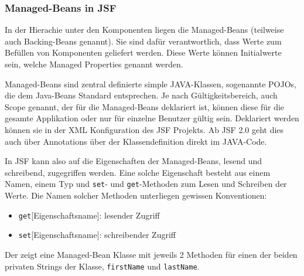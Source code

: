 \documentclass[12pt, twoside, a4paper, ngerman]{article}
\begin{document}
	

\subsubsection{Managed-Beans in JSF}

In der Hierachie unter den Komponenten liegen die Managed-Beans (teilweise auch Backing-Beans genannt). Sie sind dafür verantwortlich, dass Werte zum Befüllen von Komponenten geliefert werden. Diese Werte können Initialwerte sein, welche Managed Properties genannt werden.

Managed-Beans sind zentral definierte simple JAVA-Klassen, sogenannte \glspl{POJO}, die dem Java-Beans Standard entsprechen.
Je nach Gültigkeitsbereich, auch Scope genannt, der für die Managed-Beans deklariert ist, können diese für die gesamte Applikation oder nur für einzelne Benutzer gültig sein.
Deklariert werden können sie in der XML Konfiguration des JSF Projekts. Ab JSF 2.0 geht dies auch über Annotations über der Klassendefinition direkt im JAVA-Code. 

In JSF kann also auf die Eigenschaften der Managed-Beans, lesend und schreibend, zugegriffen werden. 
Eine solche Eigenschaft besteht aus einem Namen, einem Typ und \texttt{set}- und \texttt{get}-Methoden zum Lesen und Schreiben der Werte.
Die Namen solcher Methoden unterliegen gewissen Konventionen:
\begin{itemize}
  \item \texttt{get}[Eigenschaftsname]: lesender Zugriff
  \item \texttt{set}[Eigenschaftsname]: schreibender Zugriff
\end{itemize}

Der  zeigt eine Managed-Bean Klasse mit jeweils 2 Methoden für einen der beiden privaten Strings der Klasse, \texttt{firstName} und \texttt{lastName}.

	
\end{document}

